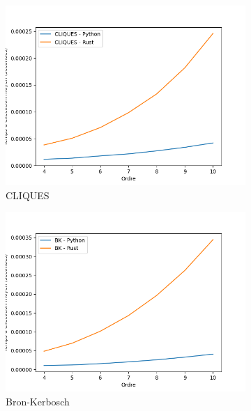 \documentclass[12pt,a4paper]{article}
\begin{document}
\begin{figure}[ht]
  \centering
  \begin{subfigure}[b]{0.45\textwidth}
    \includegraphics[width=\textwidth]{images/total_pyrust_CLIQUES_plot.png}
  \caption{CLIQUES}%
  \label{subfig:pr_cliques}
  \end{subfigure}
  \begin{subfigure}[b]{0.45\textwidth}
    \includegraphics[width=\textwidth]{images/total_pyrust_BK_plot.png}
  \caption{Bron-Kerbosch}%
  \label{subfig:pr_bk}
  \end{subfigure}
  \begin{subfigure}[b]{0.45\textwidth}

\end{subfigure}
\end{figure}
\end{document}

